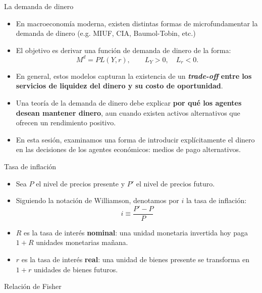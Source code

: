 \documentclass[aspectratio=169,11pt]{beamer}
\newcommand{\cidehighlight}[1]{\textcolor{CIDEBlue}{\bfseries #1}}
\begin{document}
\begin{frame}{La demanda de dinero}
    \begin{itemize}
        \item En macroeconomía moderna, existen distintas formas de microfundamentar la demanda de dinero (e.g. MIUF, CIA, Baumol-Tobin, etc.)

        \item El objetivo es derivar una función de demanda de dinero de la forma:
        \[
            M^d = PL(Y,r),
            \qquad L_Y>0,\quad L_r<0.
        \]

        \item En general, estos modelos capturan la existencia de un \cidehighlight{\textit{trade-off} entre los servicios de liquidez del dinero y su costo de oportunidad}.

        \item Una teoría de la demanda de dinero debe explicar \textbf{por qué los agentes desean mantener dinero}, aun cuando existen activos alternativos que ofrecen un rendimiento positivo.

        \item En esta sesión, examinamos una forma de introducir explícitamente el dinero en las decisiones de los agentes económicos: medios de pago alternativos.
    \end{itemize}
\end{frame}



\begin{frame}{Tasa de inflación}
  \begin{itemize}
    \setlength{\itemsep}{0.55em}
    \item Sea $P$ el nivel de precios presente y $P'$ el nivel de precios futuro.
    \item Siguiendo la notación de Williamson, denotamos por $i$ la tasa de inflación:
      \[
        i\equiv\frac{P'-P}{P}
      \]
    \item $R$ es la tasa de interés \textbf{nominal}: una unidad monetaria invertida hoy paga $1+R$ unidades monetarias mañana.
    \item $r$ es la tasa de interés \textbf{real}: una unidad de bienes presente se transforma en $1+r$ unidades de bienes futuros.
  \end{itemize}
\end{frame}



\begin{frame}{Relación de Fisher}

\end{frame}
\end{document}
